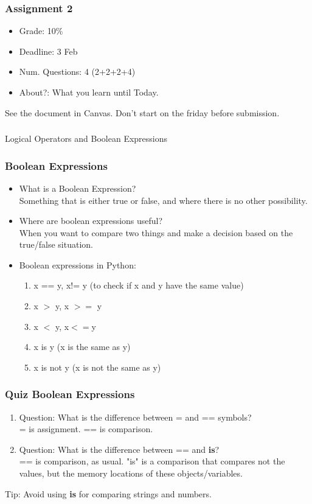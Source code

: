 \documentclass{beamer}
\begin{document}
\begin{frame}%
\frametitle{Assignment 2}
\begin{itemize}
\item Grade: 10\%
\item Deadline: 3 Feb
\item Num. Questions: 4 (2+2+2+4)
\item About?: What you learn until Today.
\end{itemize}
See the document in Canvas. Don't start on the friday before submission. 
\end{frame}

\begin{frame}
\frametitle{}
\begin{center}
Logical Operators and Boolean Expressions
\end{center}
\end{frame}

\begin{frame}%
\frametitle{Boolean Expressions}
\begin{itemize}
\item What is a Boolean Expression?
\pause \\ Something that is either true or false, and where there is no other possibility. 
\item Where are boolean expressions useful? 
\pause \\ When you want to compare two things and make a decision based on the true/false situation.
\item Boolean expressions in Python:
\begin{enumerate}
\item x == y, x!= y (to check if x and y have the same value)
\item x $>$ y, x $>=$ y 
\item x $<$ y, x$<=$y 
\item x is y (x is the same as y)
\item x is not y (x is not the same as y)
\end{enumerate}
\end{itemize}
\end{frame}

\begin{frame}%
\frametitle{Quiz Boolean Expressions}
\begin{enumerate}
\item Question: What is the difference between = and == symbols?
\\ \pause = is assignment. == is comparison.
\item Question: What is the difference between == and \textbf{is}?
\\ \pause == is comparison, as usual. "is" is a comparison that compares not the values, but the memory locations of these objects/variables.
\end{enumerate}
Tip: Avoid using \textbf{is} for comparing strings and numbers.
\end{frame}
\end{document}
